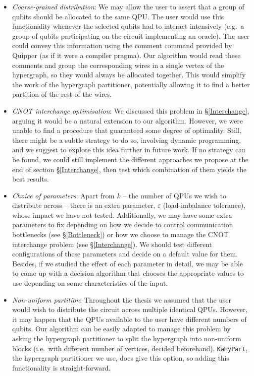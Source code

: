\begin{itemize}
  \item \textit{Coarse-grained distribution}: We may allow the user to assert that a group of qubits should be allocated to the same QPU. The user would use this functionality whenever the selected qubits had to interact intensively (e.g.\ a group of qubits participating on the circuit implementing an oracle). The user could convey this information using the comment command provided by Quipper (as if it were a compiler pragma). Our algorithm would read these comments and group the corresponding wires in a single vertex of the hypergraph, so they would always be allocated together. This would simplify the work of the hypergraph partitioner, potentially allowing it to find a better partition of the rest of the wires.
  \item \textit{CNOT interchange optimisation}: We discussed this problem in \S\ref{Interchange}, arguing it would be a natural extension to our algorithm. However, we were unable to find a procedure that guaranteed some degree of optimality. Still, there might be a subtle strategy to do so, involving dynamic programming, and we suggest to explore this idea further in future work. If no strategy can be found, we could still implement the different approaches we propose at the end of section \S\ref{Interchange}, then test which combination of them yields the best results.
  \item \textit{Choice of parameters}: Apart from \(k\) -- the number of QPUs we wish to distribute across -- there is an extra parameter, \(\varepsilon\) (load-imbalance tolerance), whose impact we have not tested. Additionally, we may have some extra parameters to fix depending on how we decide to control communication bottlenecks (see \S\ref{Bottleneck}) or how we choose to manage the CNOT interchange problem (see \S\ref{Interchange}). We should test different configurations of these parameters and decide on a default value for them. Besides, if we studied the effect of each parameter in detail, we may be able to come up with a decision algorithm that chooses the appropriate values to use depending on some characteristics of the input.
  \item \textit{Non-uniform partition}: Throughout the thesis we assumed that the user would wish to distribute the circuit across multiple identical QPUs. However, it may happen that the QPUs available to the user have different numbers of qubits. Our algorithm can be easily adapted to manage this problem by asking the hypergraph partitioner to split the hypergraph into non-uniform blocks (i.e.\ with different number of vertices, decided beforehand). \texttt{KaHyPart}, the hypergraph partitioner we use, does give this option, so adding this functionality is straight-forward.

\end{itemize}
